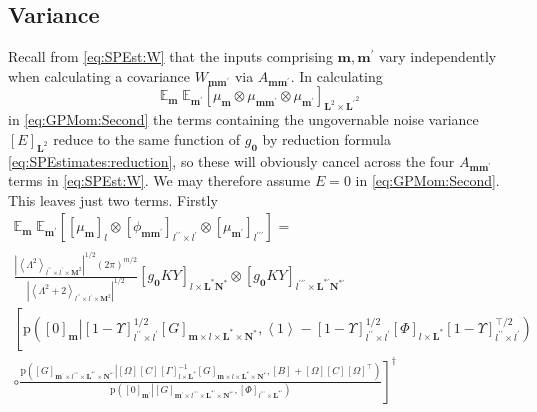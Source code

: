 \documentclass[preprint,12pt]{elsarticle}
\newcommand*{\M}[1]{\ensuremath{#1}\xspace}
\newcommand*{\x}{\times}
\newcommand*{\mi}[1]{\mathbf{#1}}
\newcommand*{\te}[2][]{\left\lbrack{#2}\right\rbrack_{#1}}
\newcommand*{\diag}[2][]{\left\langle{#2}\right\rangle_{#1}}
\newcommand*{\prob}[3]{\M{\mathrm{p}\!\left(\left.{#1}\right\vert{#2,#3}\right)}}
\newcommand*{\evt}[3][]{\mathbb{E}_{#3}^{#1}\!#2}
\newcommand*{\modulus}[1]{\M{\left\lvert{#1}\right\rvert}}
\begin{document}
    \subsection{Variance}\label{sub:GPEst:Variance}
        Recall from \cref{eq:SPEst:W} that the inputs comprising $\mi{m},\mi{m^{\prime}}$ vary independently when calculating a covariance $W_{\mi{m m^{\prime}}}$ via $A_{\mi{m m^{\prime}}}$. In calculating
        \begin{equation*}
            \evt{\;\evt{\te[\mi{L}^{2} \x \mi{L^{\prime}}^{2}]{\mu_{\mi{m}} \otimes \mu_{\mi{mm^{\prime}}} \otimes \mu_{\mi{m^{\prime}}}}}{\mi{m^{\prime}}}}{\mi{m}}
        \end{equation*}
        in \cref{eq:GPMom:Second} the terms containing the ungovernable noise variance $\te[\mi{L}^2]{E}$ reduce to the same function of $g_{\mi{0}}$ by reduction formula \cref{eq:SPEstimates:reduction}, so these will obviously cancel across the four $A_{\mi{m m^{\prime}}}$ terms in \cref{eq:SPEst:W}. 
        We may therefore assume $E=0$ in \cref{eq:GPMom:Second}. This leaves just two terms.
        Firstly
        \begin{multline*}
            \evt{\;\evt{\te[]{\te[l]{\mu_{\mi{m}}} \otimes \te[l^{\prime\prime}\x l^{\prime}]{\phi_{\mi{mm^{\prime}}}} \otimes \te[l^{\prime\prime\prime}]{\mu_{\mi{m^{\prime}}}}}}{\mi{m^{\prime}}}}{\mi{m}} = \\
            \frac
            {\modulus{\diag[l^{\prime\prime}\x l^{\prime}\x\mi{M}^{2}]{\Lambda^{2}}}^{1/2}(2\pi)^{m/2}}
            {\modulus{\diag[l^{\prime\prime}\x l^{\prime}\x\mi{M}^2]{\Lambda^{2}+2}}^{1/2}}
            \te[l\x\mi{L^{*}N^{*}}]{g_{\mi{0}}KY} \otimes
            \te[l^{\prime\prime\prime}\x\mi{L^{*\prime}N^{*\prime}}]{g_{\mi{0}}KY} \\
            \left\lbrack
            \prob{\te[\mi{m}]{0}}{\te[l^{\prime\prime}\x l^{\prime}]{1-\Upsilon}^{1/2} \te[\mi{m}\x l\x \mi{L^{*}\x N^{*}}]{G}} 
            {\diag[]{1} -
            \te[l^{\prime\prime}\x l^{\prime}]{1-\Upsilon}^{1/2} \te[l\x \mi{L^{*}}]{\Phi}\te[l^{\prime\prime}\x l^{\prime}]{1-\Upsilon}^{\intercal/2}} \phantom{\frac{_{\vert}^{\vert}}{_{\vert}^{\vert}}} \right.\\
            \left. \circ 
                \frac{
                    \prob{\te[\mi{m^{\prime}}\x l^{\prime\prime\prime}\x \mi{L^{*\prime}\x N^{*\prime}}]{G}}
                    {\te[]{\Omega} \te[]{C} \te[l\x \mi{L^{*}}]{\Gamma}^{-1} \te[\mi{m}\x l\x \mi{L^{*}\x N^{*}}]{G}}{\te[]{B}+\te[]{\Omega} \te[]{C} \te[]{\Omega}^{\intercal}}}
                    {\prob{\te[\mi{m^{\prime}}]{0}}{\te[\mi{m^{\prime}}\x l^{\prime\prime\prime}\x \mi{L^{*\prime}\x N^{*\prime}}]{G}}{\te[l^{\prime\prime\prime}\x \mi{L^{*\prime}}]{\Phi}}}
            \right\rbrack^{\dagger}
        \end{multline*}
\end{document}
